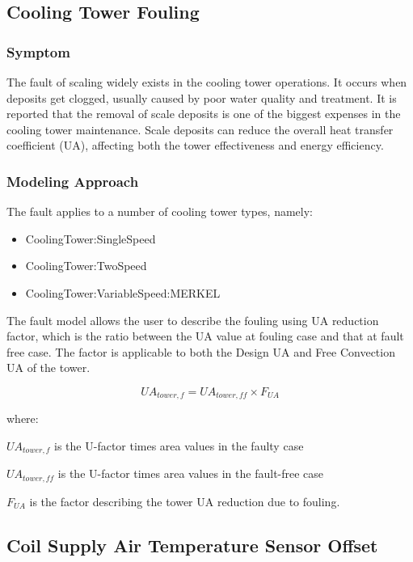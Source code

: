 \subsection{Cooling Tower Fouling}\label{cooling-tower-fouling}

\subsubsection{Symptom}

The fault of scaling widely exists in the cooling tower operations. It occurs when deposits get clogged, usually caused by poor water quality and treatment. It is reported that the removal of scale deposits is one of the biggest expenses in the cooling tower maintenance. Scale deposits can reduce the overall heat transfer coefficient (UA), affecting both the tower effectiveness and energy efficiency.

\subsubsection{Modeling Approach}

The fault applies to a number of cooling tower types, namely:

\begin{itemize}
\tightlist
\item
  CoolingTower:SingleSpeed
\item
  CoolingTower:TwoSpeed
\item
  CoolingTower:VariableSpeed:MERKEL
\end{itemize}

The fault model allows the user to describe the fouling using UA reduction factor, which is the ratio between the UA value at fouling case and that at fault free case. The factor is applicable to both the Design UA and Free Convection UA of the tower. 

\begin{equation}
UA_{tower,f} = UA_{tower,ff} \times F_{UA}
\end{equation}

where:

\(UA_{tower,f}\) is the U-factor times area values in the faulty case

\(UA_{tower,ff}\) is the U-factor times area values in the fault-free case

\(F_{UA}\) is the factor describing the tower UA reduction due to fouling.


\subsection{Coil Supply Air Temperature Sensor Offset}\label{coil-supply-air-temperature-sensor-offset}

